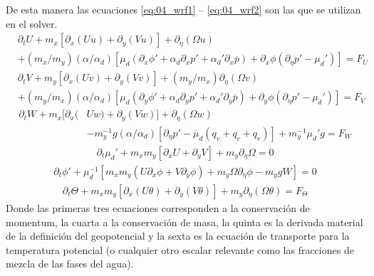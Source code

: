 \newpage
De esta manera las ecuaciones \ref{eq:04_wrf1} -- \ref{eq:04_wrf2} son las que se utilizan en el solver.
\begin{equation}\begin{split}\label{eq:04_wrf1}
&\partial_t U + m_x[\partial_x(Uu)+\partial_y(Vu)]+\partial_\eta(\Omega u) \\
&+ (m_x/m_y)(\alpha/\alpha_d)[\mu_d(\partial_x\phi' + \alpha_d \partial_x p' + \alpha_d'\partial_x \overline p)+\partial_x\phi(\partial_\eta p' - \mu_d')] = F_U
\end{split}\end{equation}
\begin{equation}\begin{split}
&\partial_t V + m_y[\partial_x(Uv)+\partial_y(Vv)]+(m_y/m_x)\partial_\eta(\Omega v) \\
&+ (m_y/m_x)(\alpha/\alpha_d)[\mu_d(\partial_y\phi' + \alpha_d \partial_y p' + \alpha_d'\partial_y \overline p)+\partial_y\phi(\partial_\eta p' - \mu_d')] = F_V
\end{split}\end{equation}
\begin{equation}\begin{split}
\partial_t W + m_x[\partial_x(&Uw)+\partial_y(Vw)]+\partial_\eta(\Omega w) \\
\hspace{1cm}&- m_y^{-1}g(\alpha/\alpha_d)[\partial_\eta p' - \overline{\mu}_d(q_v+q_c+q_r)]+m_y^{-1}\mu_d' g = F_W
\end{split}\end{equation}
\begin{equation}\begin{split}
\partial_t \mu_d' + m_x m_y[\partial_x U + \partial_y V] + m_y\partial_\eta \Omega = 0
\end{split}\end{equation}
\begin{equation}\begin{split}
\partial_t \phi' + \mu_d^{-1}[m_x m_y(U\partial_x\phi + V\partial_y\phi) + m_y \Omega \partial_\eta\phi - m_ygW] = 0
\end{split}\end{equation}
\begin{equation}\begin{split}\label{eq:04_wrf2}
\partial_t \Theta + m_x m_y [\partial_x(U\theta)+\partial_y(V\theta)]+m_y\partial_\eta(\Omega \theta) = F_\Theta
\end{split}\end{equation}
Donde las primeras tres ecuaciones corresponden a la conservación de momentum, la cuarta a la conservación de masa, la quinta es la derivada material de la definición del geopotencial y la sexta es la ecuación de transporte para la temperatura potencial (o cualquier otro escalar relevante como las fracciones de mezcla de las fases del agua).

